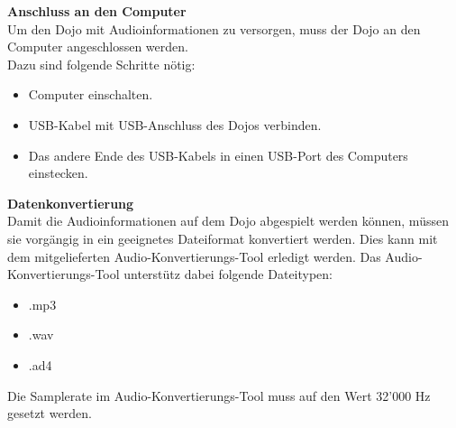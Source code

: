 \label{datenaustauschkapitel} 
\textbf{Anschluss an den Computer}
\\[4mm]
Um den Dojo mit Audioinformationen zu versorgen, muss der Dojo an den Computer angeschlossen werden.
\\[4mm]
Dazu sind folgende Schritte nötig:
\begin{itemize}
\item Computer einschalten.
\end{itemize}
\begin{itemize}
\item USB-Kabel mit USB-Anschluss des Dojos verbinden.
\end{itemize}
\begin{itemize}
\item Das andere Ende des USB-Kabels in einen USB-Port des Computers einstecken.
\end{itemize}
\textbf{Datenkonvertierung}
\\[4mm]
Damit die Audioinformationen auf dem Dojo abgespielt werden können, müssen sie vorgängig in ein geeignetes Dateiformat konvertiert werden. Dies kann mit dem mitgelieferten Audio-Konvertierungs-Tool erledigt werden. Das Audio-Konvertierungs-Tool unterstütz dabei folgende Dateitypen:
\begin{itemize}
\item .mp3
\end{itemize}
\begin{itemize}
\item .wav
\end{itemize}
\begin{itemize}
\item .ad4
\end{itemize}
Die Samplerate im Audio-Konvertierungs-Tool muss auf den Wert 32'000 Hz gesetzt werden.